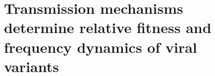\chapter{Transmission mechanisms determine relative fitness and frequency dynamics of viral variants}
